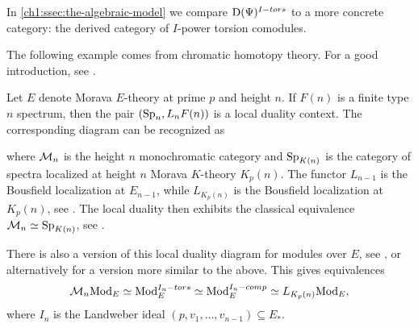 In \cref{ch1:ssec:the-algebraic-model} we compare $\mathrm{D}(\Psi)^{I-tors}$ to a more concrete category: the derived category of $I$-power torsion comodules.  

The following example comes from chromatic homotopy theory. For a good introduction, see \cite{barthel-beaudry_19}. 

\begin{example}
    \label{ch1:ex:local-duality-chromatic}
    Let $E$ denote Morava $E$-theory at prime $p$ and height $n$. If $F(n)$ is a finite type $n$ spectrum, then the pair $(\mathrm{Sp}_{n}, L_n F(n) )$ is a local duality context. The corresponding diagram can be recognized as
    \begin{center}
    \end{center}
    where $\mathcal{M}_{n}$ is the height $n$ monochromatic category and $\mathrm{Sp}_{K(n)}$ is the category of spectra localized at height $n$ Morava $K$-theory $K_p(n)$. The functor $L_{n-1}$ is the Bousfield localization at $E_{n-1}$, while $L_{K_p(n)}$ is the Bousfield localization at $K_p(n)$, see \cite{bousfield_1979_localization}. The local duality then exhibits the classical equivalence $\mathcal{M}_{n}\simeq \mathrm{Sp}_{K(n)}$, see \cite[6.19]{hovey-strickland_99}. 
\end{example}

\begin{remark}
    \label{ch1:rm:local-duality-modules}
    There is also a version of this local duality diagram for modules over $E$, see \cite[4.2, 5.1]{greenlees-may_1995}, or alternatively \cite[3.7]{barthel-heard-valenzuela_2018} for a version more similar to the above. This gives equivalences 
    \[\mathcal{M}_{n}\mathrm{Mod}_E\simeq \mathrm{Mod}_E^{I_n-tors}\simeq \mathrm{Mod}_E^{I_n-comp}\simeq L_{K_p(n)}\mathrm{Mod}_E,\]
    where $I_n$ is the Landweber ideal $(p,v_1, \ldots, v_{n-1})\subseteq E_*$.
\end{remark}







